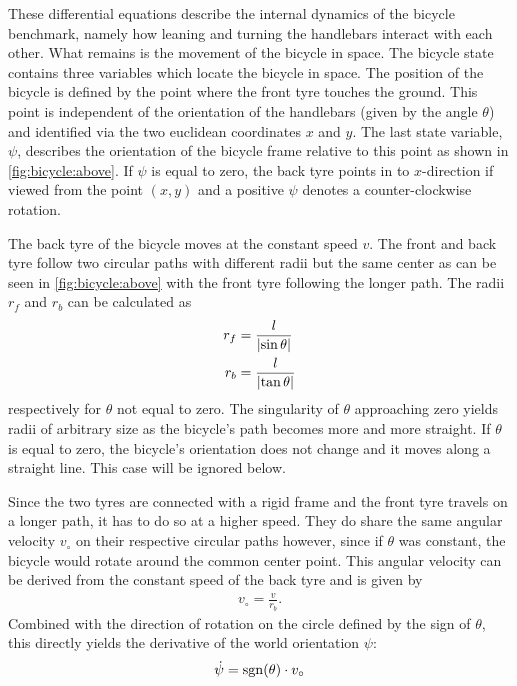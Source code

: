 These differential equations describe the internal dynamics of the bicycle benchmark, namely how leaning and turning the handlebars interact with each other.
What remains is the movement of the bicycle in space.
The bicycle state contains three variables which locate the bicycle in space.
The position of the bicycle is defined by the point where the front tyre touches the ground.
This point is independent of the orientation of the handlebars (given by the angle $\theta$) and identified via the two euclidean coordinates $x$ and $y$.
The last state variable, $\psi$, describes the orientation of the bicycle frame relative to this point as shown in \cref{fig:bicycle:above}.
If $\psi$ is equal to zero, the back tyre points in to $x$-direction if viewed from the point $(x, y)$ and a positive $\psi$ denotes a counter-clockwise rotation.

The back tyre of the bicycle moves at the constant speed $v$.
The front and back tyre follow two circular paths with different radii but the same center as can be seen in \cref{fig:bicycle:above} with the front tyre following the longer path.
The radii $r_f$ and $r_b$ can be calculated as
\begin{align}
    r_f &= \frac{l}{\abs*{\sin \theta}} \\
    r_b &= \frac{l}{\abs*{\tan \theta}}
\end{align}
respectively for $\theta$ not equal to zero.
The singularity of $\theta$ approaching zero yields radii of arbitrary size as the bicycle's path becomes more and more straight.
If $\theta$ is equal to zero, the bicycle's orientation does not change and it moves along a straight line.
This case will be ignored below.

Since the two tyres are connected with a rigid frame and the front tyre travels on a longer path, it has to do so at a higher speed.
They do share the same angular velocity $v_\circ$ on their respective circular paths however, since if $\theta$ was constant, the bicycle would rotate around the common center point.
This angular velocity can be derived from the constant speed of the back tyre and is given by
\begin{align}
    v_\circ = \frac{v}{r_b}.
\end{align}
Combined with the direction of rotation on the circle defined by the sign of $\theta$, this directly yields the derivative of the world orientation $\psi$:
\begin{align}
    \dot{\psi} = \sgn(\theta) \cdot v_\circ
\end{align}

